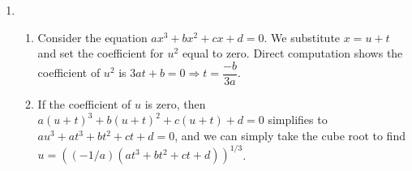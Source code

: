 \documentclass[11pt]{book}
\theoremstyle{definition}
\begin{document}
\begin{enumerate}
\begin{enumerate}
\begin{proof}
\begin{align*}
\left(\int_a^b |f(x)|dx\right)^2 &\leq \left(\int_a^b |f(x)|^2dx\right)(b-a) \\
&\leq |A|(b-a)\int_a^b |f(x)|dx \text{ (by the problem hypothesis)}\\
&= \left|\int_a^b f(x)dx\right|\int_a^b |f(x)|dx \\
&= \left(\int_a^b |f(x)|dx\right)^2
\end{align*}
Therefore we actually have an equality in Cauchy-Schwarz so we know $|f(x)|=c\cdot 1$, for $c\in\R$, which, together with $\mathrm{arg}(f)$ being constant, implies that $f(x)$ is constant.
\end{proof}
\item 
Assume $|A|=(1/(b-a))\int_a^b |f(x)|dx$. Define $\lambda = \dfrac{|\int_a^bf(x)dx|}{\int_a^bf(x)dx}$. If the denominator of $\lambda$ is zero, then $\int_a^b f=0$ together with the hypothesis of the problem implies $0=\int_a^b |f(x)|dx$, so that $|f(x)|=0$, by continuity, or that $f(x)$ is a constant identically zero, and the result follows anyway.
\begin{proof}
Assume the denominator of $\lambda$ is nonzero. By the hypothesis of this problem, $\int_a^b \lambda f(x)dx=\left|\int_a^b f(x)dx\right| = \int_a^b |f(x)|dx=\int_a^b|\lambda f(x)|dx$, which implies $\int_a^b Re(\lambda f(x))dx = \int_a^b |\lambda f(x)|dx$. Equivalently, $\int_a^b |\lambda f(x)| - Re(\lambda f(x))dx =0$, but since the integrand is nonnegative and continuous, we have $Re(\lambda f(x))=|\lambda f(x)|$, which tells us $\lambda f(x) \in \R_{\geq 0}$, or that for some nonnegative function $g(x)$, $\lambda f(x)=g(x)$. Solving for $f(x)$ yields $f(x)=\lambda^{-1}g(x)$, or that $f(x)$ is the product of a fixed complex number times a real valued function, as required.
\end{proof}
\end{enumerate}
\item
\begin{enumerate}
\item Consider the equation $ax^3+bx^2+cx+d=0$. We substitute $x=u+t$ and set the coefficient for $u^2$ equal to zero. Direct computation shows the coefficient of $u^2$ is $3at+b=0\Rightarrow t=\dfrac{-b}{3a}$.
\item If the coefficient of $u$ is zero, then $a(u+t)^3+b(u+t)^2+c(u+t)+d=0$ simplifies to $au^3+at^3+bt^2+ct+d=0$, and we can simply take the cube root to find $u=((-1/a)(at^3+bt^2+ct+d))^{1/3}$.
\\ \\

\end{enumerate}
\end{enumerate}
\end{document}
